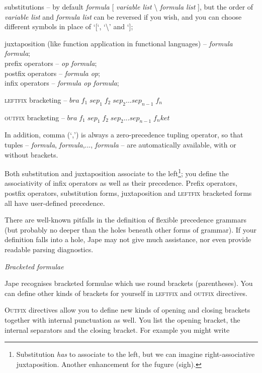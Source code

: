 \documentclass[11pt]{book}
\newcommand{\tab}{\hspace{5mm}}
\begin{document}
{\textbullet}\tab substitutions -- by default \textit{formula} [ \textit{variable list} {\textbackslash} \textit{formula list} ], but the order of \textit{variable list} and \textit{formula list} can be reversed if you wish, and you can choose different symbols in place of `[`, `{\textbackslash}' and `];


{\textbullet}\tab juxtaposition (like function application in functional languages) -- \textit{formula formula};\\
{\textbullet}\tab prefix operators -- \textit{op formula};\\
{\textbullet}\tab postfix operators -- \textit{formula op};\\
{\textbullet}\tab infix operators -- \textit{formula op formula};


{\textbullet}\tab \textsc{leftfix} bracketing -- $bra\;f_{1} \;sep_{1} \;f_{2} \;sep_{2} ...sep_{n-1} \;f_{n} $



{\textbullet}\tab \textsc{outfix} bracketing -- $bra\;f_{1} \;sep_{1} \;f_{2} \;sep_{2} ...sep_{n-1} \;f_{n} ket$



In addition, comma (`,') is always a zero-precedence tupling operator, so that tuples -- \textit{formula}, \textit{formula},..., \textit{formula} -- are automatically available, with or without brackets.


Both substitution and juxtaposition associate to the left\footnote{Substitution \textit{has} to associate to the left, but we can imagine right-associative juxtaposition. Another enhancement for the fugure (sigh).}; you define the associativity of infix operators as well as their precedence. Prefix operators, postfix operators, substitution forms, juxtaposition and \textsc{leftfix} bracketed forms all have user-defined precedence.


There are well-known pitfalls in the definition of flexible precedence grammars (but probably no deeper than the holes beneath other forms of grammar). If your definition falls into a hole, Jape may not give much assistance, nor even provide readable parsing diagnostics.


\textit{Bracketed formulae}


Jape recognises bracketed formulae which use round brackets (parentheses). You can define other kinds of brackets for yourself in \textsc{leftfix} and \textsc{outfix} directives.


\textsc{Outfix} directives allow you to define new kinds of opening and closing brackets together with internal punctuation as well. You list the opening bracket, the internal separators and the closing bracket. For example you might write
\end{document}
